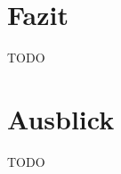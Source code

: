  \label{finalThoughts}

\section{Fazit} \label{sec:finalThoughts-conclusion}
TODO \\

\section{Ausblick} \label{sec:finalThoughts-outlook}
TODO \\
